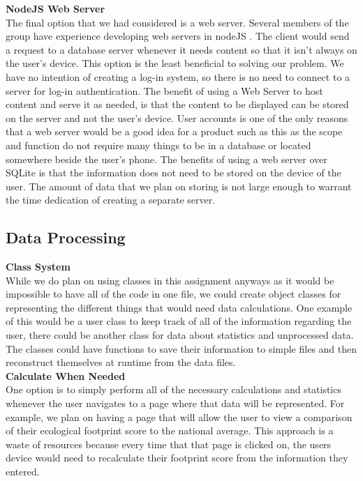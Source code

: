 \documentclass[onecolumn, draftclsnofoot,10pt, compsoc]{IEEEtran}
\begin{document}
\noindent \textbf{NodeJS Web Server} \\
The final option that we had considered is a web server. 
Several members of the group have experience developing web servers in nodeJS \cite{nodejs}.
The client would send a request to a database server whenever it needs content so that it isn't always on the user's device.
This option is the least beneficial to solving our problem. 
We have no intention of creating a log-in system, so there is no need to connect to a server for log-in authentication.
The benefit of using a Web Server to host content and serve it as needed, is that the content to be displayed can be stored on the server and not the user's device.
User accounts is one of the only reasons that a web server would be a good idea for a product such as this as the scope and function do not require many things to be in a database or located somewhere beside the user's phone.
The benefits of using a web server over SQLite is that the information does not need to be stored on the device of the user.
The amount of data that we plan on storing is not large enough to warrant the time dedication of creating a separate server.\\

\clearpage

\subsection{Data Processing}

\noindent \textbf{Class System} \\
While we do plan on using classes in this assignment anyways as it would be impossible to have all of the code in one file, we could create object classes for representing the different things that would need data calculations. One example of this would be a user class to keep track of all of the information regarding the user, there could be another class for data about statistics and unprocessed data.
The classes could have functions to save their information to simple files and then reconstruct themselves at runtime from the data files.\\

\noindent \textbf{Calculate When Needed} \\
One option is to simply perform all of the necessary calculations and statistics whenever the user navigates to a page where that data will be represented.
For example, we plan on having a page that will allow the user to view a comparison of their ecological footprint score to the national average.
This approach is a waste of resources because every time that that page is clicked on, the users device would need to recalculate their footprint score from the information they entered.\\
\end{document}
